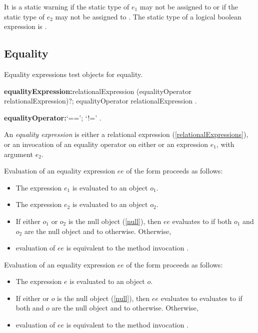\documentclass{article}
\begin{document}
\LMHash{}
It is a static warning if the static type of $e_1$ may not be assigned to  or if the static type of $e_2$ may not be assigned to .
The static type of a logical boolean expression is .


\subsection{Equality}

\LMHash{}
Equality expressions test objects for equality.

\begin{grammar}
{\bf equalityExpression:}relationalExpression (equalityOperator relationalExpression)?;
  \SUPER{} equalityOperator relationalExpression
  .

{\bf equalityOperator:}`==';
  `!='
  .
\end{grammar}

\LMHash{}
An {\em equality expression} is either a relational expression (\ref{relationalExpressions}), or an invocation of an equality operator on either \SUPER{} or an expression $e_1$, with argument $e_2$.

\LMHash{}
Evaluation of an equality expression $ee$ of the form  proceeds as follows:
\begin{itemize}
\item The expression $e_1$ is evaluated to an object $o_1$.
\item The expression $e_2$ is evaluated to an object $o_2$.
\item If either $o_1$ or $o_2$ is the null object (\ref{null}), then $ee$ evaluates to \TRUE{} if both $o_1$ and $o_2$ are the null object and to \FALSE{} otherwise.
Otherwise,
\item evaluation of $ee$ is equivalent to the method invocation .
\end{itemize}

\LMHash{}
Evaluation of an equality expression $ee$ of the form  proceeds as follows:
\begin{itemize}
\item The expression $e$ is evaluated to an object $o$.
\item If either \THIS{} or $o$ is the null object (\ref{null}), then $ee$ evaluates to evaluates to \TRUE{} if both \THIS{} and $o$ are the null object and to \FALSE{} otherwise.
Otherwise,
\item evaluation of $ee$ is equivalent to the method invocation .
\end{itemize}
\end{document}
